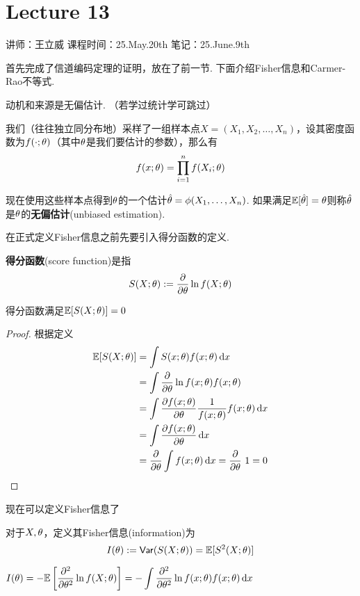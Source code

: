 \chapter{Lecture 13}

\begin{center}
    讲师：王立威 \qquad
    课程时间：25.May.20th \qquad 
    笔记：25.June.9th
\end{center}

\bigskip

首先完成了信道编码定理的证明，放在了前一节. 下面介绍Fisher信息和Carmer-Rao不等式. 

动机和来源是无偏估计. （若学过统计学可跳过）
\begin{definition}[无偏估计]
    我们（往往独立同分布地）采样了一组样本点$X=(X_1,X_2,\dots, X_n)$，设其密度函数为$f(\cdot;\theta)$（其中$\theta$是我们要估计的参数），那么有 
    \[
    f(x;\theta) = \prod_{i=1}^n f(X_i; \theta)
    \]
    
    现在使用这些样本点得到$\theta$的一个估计$\hat{\theta} = \phi(X_1,\dots, X_n)$. 如果满足$\mathbb{E}[\hat{\theta}] = \theta$则称$\hat{\theta}$是$\theta$的\textbf{无偏估计}(unbiased estimation).
\end{definition} 

在正式定义Fisher信息之前先要引入得分函数的定义. 
\begin{definition}[得分函数]
    \textbf{得分函数}(score function)是指 
    \[
    S(X;\theta) := \dfrac{\partial}{\partial\theta} \ln f(X;\theta)
    \]
\end{definition}

\begin{proposition}
    得分函数满足$\mathbb{E}[S(X;\theta)] = 0$
\end{proposition}
\begin{proof}
    根据定义 
    \begin{align*}
        \mathbb{E}[S(X;\theta)] & = \int S(x;\theta) f(x;\theta) \mathop{}\!\mathrm{d}x \\
        & = \int \dfrac{\partial}{\partial\theta} \ln f(x;\theta) f(x;\theta) \\
        & = \int \dfrac{\partial f(x;\theta)}{\partial\theta} \dfrac{1}{f(x;\theta)} f(x;\theta) \mathop{}\!\mathrm{d}x \\ 
        & = \int \dfrac{\partial f(x;\theta)}{\partial\theta} \mathop{}\!\mathrm{d}x \\
        & = \dfrac{\partial}{\partial\theta}\int f(x;\theta) \mathop{}\!\mathrm{d}x = \dfrac{\partial}{\partial\theta} \ 1 = 0
    \end{align*}
\end{proof} 

现在可以定义Fisher信息了
\begin{definition}[Fisher信息]
    对于$X,\theta$，定义其Fisher信息(information)为 
    \[
    I(\theta) := \mathsf{Var}(S(X;\theta)) = \mathbb{E}[S^2(X;\theta)]
    \]
\end{definition}

\begin{proposition}
    $I(\theta) = -\mathbb{E}\left[
        \dfrac{\partial^2}{\partial\theta^2} \ln f(X;\theta)
    \right] = -\displaystyle\int \dfrac{\partial^2}{\partial\theta^2} \ln f(x;\theta) f(x;\theta) \mathop{}\!\mathrm{d}x$
\end{proposition}
